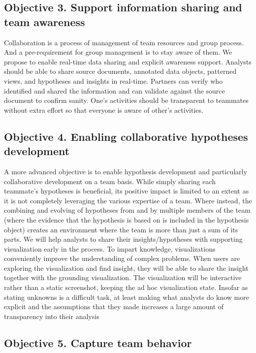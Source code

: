 \subsection{Objective 3. Support information sharing and team awareness}

Collaboration is a process of management of team resources and group process. And a pre-requirement for group management is to stay aware of them. We propose to enable real-time data sharing and explicit awareness support.
Analysts should be able to share source documents, annotated data objects, patterned
views, and hypotheses and insights in real-time. Partners can verify who
identified and shared the information and can validate against the source
document to confirm sanity. One’s activities should be transparent to teammates
without extra effort so that everyone is aware of other’s activities.

\subsection{Objective 4. Enabling collaborative hypotheses development}

A more advanced objective is to enable hypothesis development and particularly collaborative development on a team basis. While simply
sharing each teammate's hypotheses is beneficial, its positive impact is
limited to an extent as it is not completely leveraging the various expertise
of a team. Where instead, the combining and evolving of hypotheses from and by
multiple members of the team (where the evidence that the hypothesis is based
on is included in the hypothesis object) creates an environment where the team
is more than just a sum of its parts. We will help analysts to share their
insights/hypotheses with supporting visualization early in the process. To
impart knowledge, visualizations conveniently improve the understanding of
complex problems. When users are exploring the visualization and find
insight, they will be able to share the insight together with the grounding
visualization. The visualization will be interactive rather than a static
screenshot, keeping the ad hoc visualization state. Insofar as stating unknowns
is a difficult task, at least making what analysts do know more explicit and
the assumptions that they made increases a large amount of transparency into
their analysis

\subsection{Objective 5. Capture team behavior}

